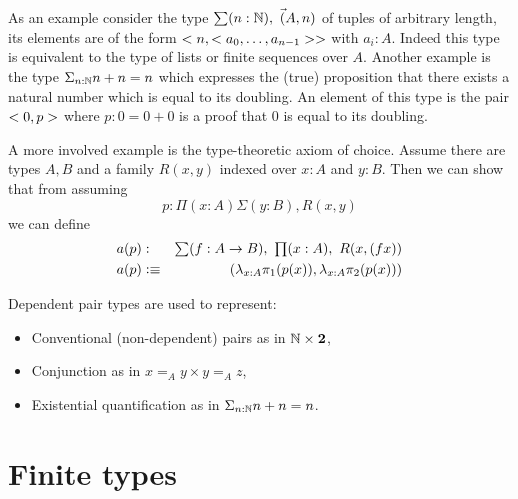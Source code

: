 {%

As an example consider the type $\sm{n:\Nat}\Vec(A,n)$ of tuples of
arbitrary length, its elements are of the form
$<n,<a_0,\dots,a_{n-1}>>$ with $a_i : A$. Indeed this type is
equivalent to the type of lists or finite sequences over $A$. Another example is the type
$\Sigma_{n:\mathbb{N}}n+n = n$ which expresses the (true) proposition that
there exists a natural number which is equal to its doubling. An
element of this type is the pair $<0,p>$ where $p: 0 = 0+0$ is a
proof that $0$ is equal to its doubling.

A more involved example is the type-theoretic axiom of choice. Assume
there are types $A,B$ and a family $R(x,y)$ indexed over $x:A$ and
$y:B$. Then we can show that from assuming 
\[p : \Pi(x:A)\Sigma(y :B),R(x,y)\] 
we can define 
\begin{eqnarray*}
a(p) & : & \sm{f : A \to B} \prd{x:A} R(x,(fx)) \\
a(p) & \defeq & (\lambda_{x:A} \pi_1(p(x)),\lambda_{x:A} \pi_2(p(x)))
\end{eqnarray*}

Dependent pair types are used to represent:
\begin{itemize}
\item Conventional (non-dependent) pairs as in $\mathbb{N} \times \mathbf{2}$,
\item Conjunction as in $x =_A y \times y =_A z$,
\item Existential quantification as in $\Sigma_{n:\mathbb{N}}n+n = n$.
\end{itemize}

\section{Finite types}
\label{sec:finite-types}

}
